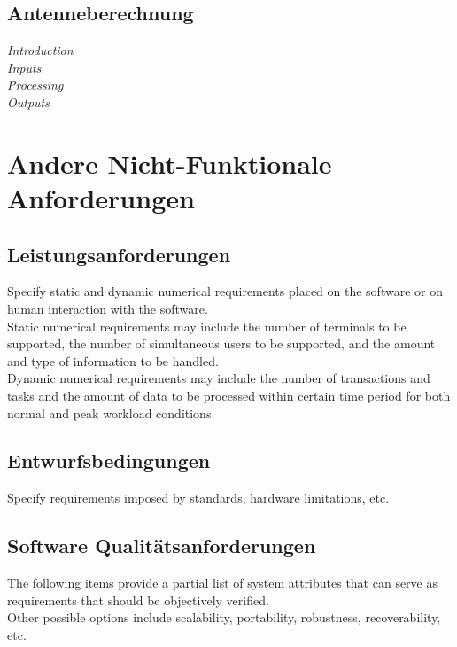 \subsection{Antenneberechnung}


\noindent \textit{\large Introduction} \\
\textit{\large Inputs} \\
\textit{\large Processing} \\
\textit{\large Outputs} \\

\newpage

\section{Andere Nicht-Funktionale Anforderungen}

\subsection{Leistungsanforderungen}
Specify static and dynamic numerical requirements placed on the software or on human interaction with the software. \\[-0.3cm]

\noindent Static numerical requirements may include the number of terminals to be supported, the number of simultaneous users to be supported, and the amount and type of information to be handled. \\[-0.3cm]

\noindent Dynamic numerical requirements may include the number of transactions and tasks and the amount of data to be processed within certain time period for both normal and peak workload conditions.

\subsection{Entwurfsbedingungen}
Specify requirements imposed by standards, hardware limitations, etc.

\subsection{Software Qualitätsanforderungen}
The following items provide a partial list of system attributes that can serve as requirements that should be objectively verified. \\[0.1cm]
Other possible options include scalability, portability, robustness, recoverability, etc.


